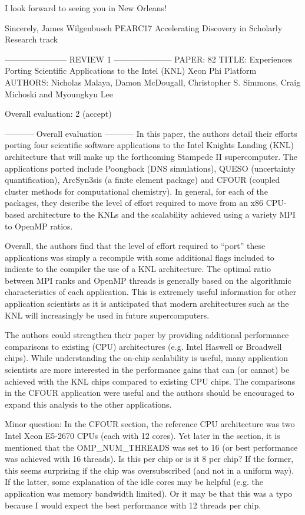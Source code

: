 I look forward to seeing you in New Orleans!

Sincerely,
James Wilgenbusch
PEARC17 Accelerating Discovery in Scholarly Research track


----------------------- REVIEW 1 ---------------------
PAPER: 82
TITLE: Experiences Porting Scientific Applications to the Intel (KNL)
Xeon Phi Platform
AUTHORS: Nicholas Malaya, Damon McDougall, Christopher S. Simmons, Craig
Michoski and Myoungkyu Lee

Overall evaluation: 2 (accept)

----------- Overall evaluation -----------
In this paper, the authors detail their efforts porting four scientific
software applications to the Intel Knights Landing (KNL) architecture
that will make up the forthcoming Stampede II supercomputer.  The
applications ported include Poongback (DNS simulations), QUESO
(uncertainty quantification), ArcSyn3sis (a finite element package) and
CFOUR (coupled cluster methods for computational chemistry).  In
general, for each of the packages, they describe the level of effort
required to move from an x86 CPU-based architecture to the KNLs and the
scalability achieved using a variety MPI to OpenMP ratios.

Overall, the authors find that the level of effort required to “port”
these applications was simply a recompile with some additional flags
included to indicate to the compiler the use of a KNL architecture.  The
optimal ratio between MPI ranks and OpenMP threads is generally based on
the algorithmic characteristics of each application.  This is extremely
useful information for other application scientists as it is anticipated
that modern architectures such as the KNL will increasingly be used in
future supercomputers.

The authors could strengthen their paper by providing additional
performance comparisons to existing (CPU) architectures (e.g. Intel
Haswell or Broadwell chips).  While understanding the on-chip
scalability is useful, many application scientists are more interested
in the performance gains that can (or cannot) be achieved with the KNL
chips compared to existing CPU chips.  The comparisons in the CFOUR
application were useful and the authors should be encouraged to expand
this analysis to the other applications.

Minor question: In the CFOUR section, the reference CPU architecture was
two Intel Xeon E5-2670 CPUs (each with 12 cores).  Yet later in the
section, it is mentioned that the OMP_NUM_THREADS was set to 16 (or best
performance was achieved with 16 threads).  Is this per chip or is it 8
per chip?  If the former, this seems surprising if the chip was
oversubscribed (and not in a uniform way).  If the latter, some
explanation of the idle cores may be helpful (e.g. the application was
memory bandwidth limited).  Or it may be that this was a typo because I
would expect the best performance with 12 threads per chip.


